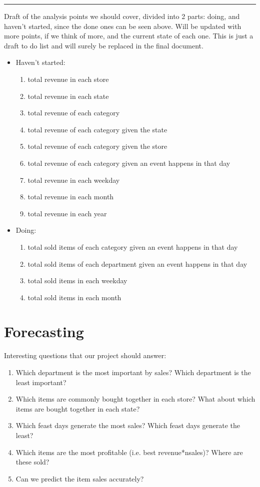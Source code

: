 \documentclass[12pt]{article}
\begin{document}
\par\noindent\rule{\linewidth}{2px}
Draft of the analysis points we should cover, divided into 2 parts: doing, and haven't started, since the done ones can be seen above. Will be updated with more points, if we think of more, and the current state of each one. This is just a draft to do list and will surely be replaced in the final document.
\begin{itemize}
    \item Haven't started: \begin{enumerate}
        \item total revenue in each store
        \item total revenue in each state
        \item total revenue of each category
        \item total revenue of each category given the state
        \item total revenue of each category given the store
        \item total revenue of each category given an event happens in that day
        \item total revenue in each weekday
        \item total revenue in each month
        \item total revenue in each year
    \end{enumerate}
    \item Doing:  \begin{enumerate}
        \item total sold items of each category given an event happens in that day
       \item total sold items of each department given an event happens in that day
        \item total sold items in each weekday
        \item total sold items in each month
    \end{enumerate}
\end{itemize}

\clearpage
\section{Forecasting}

Interesting questions that our project should answer:
\begin{enumerate}
    \item Which department is the most important by sales? Which department is the least important?
    \item Which items are commonly bought together in each store? What about which items are bought together in each state?
    \item Which feast days generate the most sales? Which feast days generate the least?
    \item Which items are the most profitable (i.e. best revenue*nsales)? Where are these sold?
    \item Can we predict the item sales accurately?
\end{enumerate}
\end{document}
